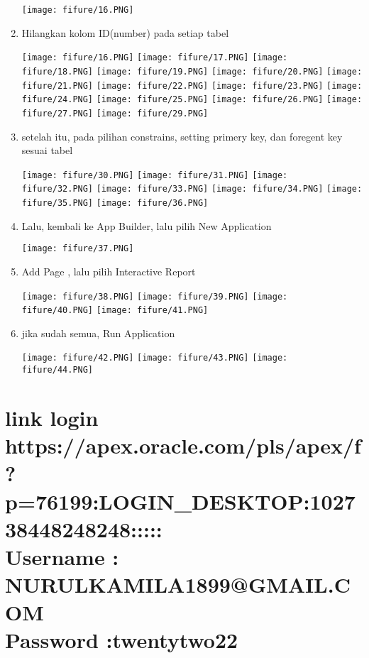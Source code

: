 \documentclass{article}
\begin{document}
\begin{enumerate}
     \begin{center}
    \texttt{[image: fifure/16.PNG]}
    \end{center}
    \item Hilangkan kolom ID(number) pada setiap tabel
     \begin{center}
    \texttt{[image: fifure/16.PNG]}
    \texttt{[image: fifure/17.PNG]}
    \texttt{[image: fifure/18.PNG]}
    \texttt{[image: fifure/19.PNG]}
    \texttt{[image: fifure/20.PNG]}
    \texttt{[image: fifure/21.PNG]}
    \texttt{[image: fifure/22.PNG]}
    \texttt{[image: fifure/23.PNG]}
    \texttt{[image: fifure/24.PNG]}
    \texttt{[image: fifure/25.PNG]}
    \texttt{[image: fifure/26.PNG]}
    \texttt{[image: fifure/27.PNG]}
    \texttt{[image: fifure/29.PNG]}
    \end{center}
    \item setelah itu, pada pilihan constrains, setting primery key, dan foregent key sesuai tabel 
    \begin{center}
    \texttt{[image: fifure/30.PNG]}
    \texttt{[image: fifure/31.PNG]}
    \texttt{[image: fifure/32.PNG]}
    \texttt{[image: fifure/33.PNG]}
    \texttt{[image: fifure/34.PNG]}
    \texttt{[image: fifure/35.PNG]}
    \texttt{[image: fifure/36.PNG]}
    \end{center}
    \item Lalu, kembali ke App Builder, lalu pilih New Application
     \begin{center}
    \texttt{[image: fifure/37.PNG]}
    \end{center}
    \item Add Page , lalu pilih Interactive Report
     \begin{center}
    \texttt{[image: fifure/38.PNG]}
     \texttt{[image: fifure/39.PNG]}
      \texttt{[image: fifure/40.PNG]}
       \texttt{[image: fifure/41.PNG]}
    \end{center}
    \item jika sudah semua, Run Application
     \begin{center}
    \texttt{[image: fifure/42.PNG]}
    \texttt{[image: fifure/43.PNG]}
    \texttt{[image: fifure/44.PNG]}
    \end{center}
\end{enumerate}

\section{link login  https://apex.oracle.com/pls/apex/f?p=76199:LOGIN_DESKTOP:102738448248248::::: \\
Username : NURULKAMILA1899@GMAIL.COM \\
Password :twentytwo22 }
\end{document}
